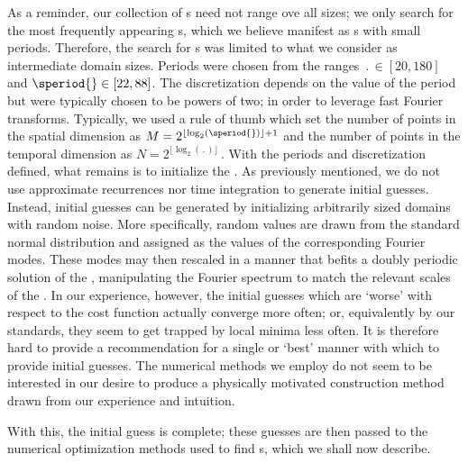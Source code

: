 As a reminder, our collection of {\po}s need not range ove all sizes;
we only search for the most frequently appearing {\fpo}s,
which we believe manifest as {\po}s with small periods. Therefore,
the search for {\po}s was limited to what we consider as intermediate domain sizes.
Periods were chosen from the ranges
$\period{}\in [20, 180]$ and $\speriod{} \in [22, 88]$. The discretization depends on
the value of the period but were typically chosen to be powers of two; in order
to leverage fast Fourier transforms. %
Typically, we used a rule of thumb which set the number of points in the
spatial dimension as $M = 2^{\lfloor\log_2(\speriod{})\rfloor + 1}$
and the number of points in the temporal dimension as
$
N = 2^{\lfloor\log_2(\period{})\rfloor}\,.
$
With the periods and discretization defined, what remains is to
initialize the {\spt} {\Fcs}.
As previously mentioned, we do not use
approximate recurrences nor time integration
to generate initial guesses.
Instead, initial guesses can be generated by initializing arbitrarily
sized domains with random noise.
More specifically, random values are drawn from the standard normal distribution
and assigned as the values of the corresponding Fourier modes.
These modes may then rescaled in a manner that befits a
doubly periodic solution of the {\KSe},
manipulating the Fourier spectrum to match the relevant scales of the \KSe.
In our experience, however, the initial guesses which are `worse' with respect
to the cost function actually converge more often; or, equivalently by our standards,
they seem to get trapped by local minima less often.
It is therefore hard to provide a recommendation for a single or `best'
manner with which to provide initial guesses. The
numerical methods we employ do not seem to be interested in our desire
to produce a physically motivated construction method
drawn from our experience and intuition.


With this, the initial guess is complete; these guesses are then passed
to the numerical optimization methods used to find {\po}s, which we shall now describe.

